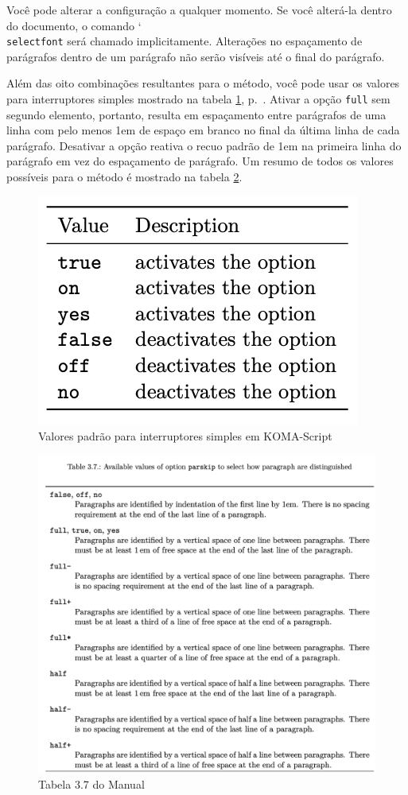 Você pode alterar a configuração a qualquer momento. Se você alterá-la dentro do documento, o comando \char`\\\texttt{se\-lect\-font} será chamado implicitamente. Alterações no espaçamento de parágrafos dentro de um parágrafo não serão visíveis até o final do parágrafo.

Além das oito combinações resultantes para o método, você pode usar os valores para interruptores simples mostrado na tabela \ref{fig:8_1}, p.~\pageref{fig:8_1}. Ativar a opção \texttt{full} sem segundo elemento, portanto, resulta em espaçamento entre parágrafos de uma linha com pelo menos 1em de espaço em branco no final da última linha de cada parágrafo. Desativar a opção reativa o recuo padrão de 1em na primeira linha do parágrafo em vez do espaçamento de parágrafo. Um resumo de todos os valores possíveis para o método é mostrado na tabela \ref{fig:tab3_7}.

\begin{figure}[ht]
    \centering
    \includegraphics[width=0.5\linewidth]{arquivos/tab2_5.png}
    \caption{Valores padrão para interruptores simples em KOMA-Script}
    \label{fig:8_1}
\end{figure}

\begin{figure}[ht]
    \centering
    \includegraphics[width=0.9\linewidth]{imagens/tab3_7.png}
    \caption{Tabela 3.7 do Manual}
    \label{fig:tab3_7}
\end{figure}

